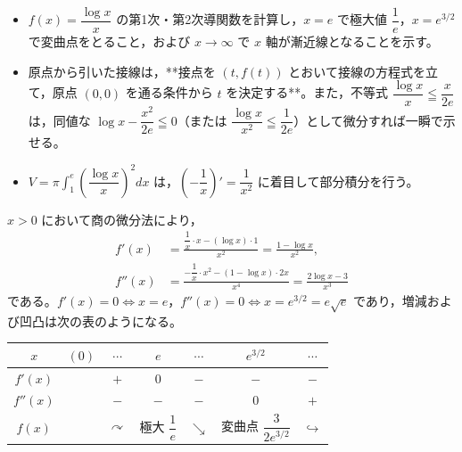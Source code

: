 

\begin{itemize}[leftmargin=1.6em,itemsep=2pt,topsep=2pt]
  \item[(1)] $f(x)=\dfrac{\log x}{x}$ の第1次・第2次導関数を計算し，$x=e$ で極大値 $\dfrac{1}{e}$，$x=e^{3/2}$ で変曲点をとること，および $x\to\infty$ で $x$ 軸が漸近線となることを示す。
  \item[(2)] 原点から引いた接線は，**接点を $(t, f(t))$ とおいて接線の方程式を立て，原点 $(0,0)$ を通る条件から $t$ を決定する**。また，不等式 $\dfrac{\log x}{x}\leqq\dfrac{x}{2e}$ は，同値な $\log x-\dfrac{x^{2}}{2e}\leqq 0$（または $\dfrac{\log x}{x^{2}}\leqq\dfrac{1}{2e}$）として微分すれば一瞬で示せる。
  \item[(4)] $V=\pi\int_{1}^{e}\left(\dfrac{\log x}{x}\right)^{2}dx$ は，$\left(-\dfrac{1}{x}\right)'=\dfrac{1}{x^{2}}$ に着目して部分積分を行う。
\end{itemize}

$x>0$ において商の微分法により，
\begin{align*}
  f'(x) &= \frac{\dfrac{1}{x}\cdot x - (\log x)\cdot 1}{x^{2}} = \frac{1-\log x}{x^{2}},\\
  f''(x) &= \frac{-\dfrac{1}{x}\cdot x^{2} - (1-\log x)\cdot 2x}{x^{4}} = \frac{2\log x - 3}{x^{3}}
\end{align*}
である。$f'(x)=0\iff x=e$，$f''(x)=0\iff x=e^{3/2}=e\sqrt{e}$ であり，増減および凹凸は次の表のようになる。

\begin{center}
\renewcommand{\arraystretch}{1.35}
\begin{tabular}{|c||c|c|c|c|c|c|}
\hline
$x$ & $(0)$ & $\cdots$ & $e$ & $\cdots$ & $e^{3/2}$ & $\cdots$ \\
\hline
$f'(x)$ & & $+$ & $0$ & $-$ & $-$ & $-$ \\
\hline
$f''(x)$ & & $-$ & $-$ & $-$ & $0$ & $+$ \\
\hline
$f(x)$ & & $\curvearrowright$ & 極大 $\dfrac{1}{e}$ & $\searrow$ & 変曲点 $\dfrac{3}{2e^{3/2}}$ & $\hookrightarrow$ \\
\hline
\end{tabular}
\end{center}

